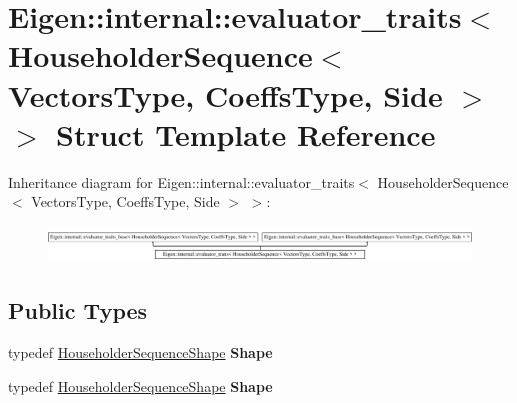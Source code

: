 \hypertarget{struct_eigen_1_1internal_1_1evaluator__traits_3_01_householder_sequence_3_01_vectors_type_00_01_5d5adf52607be62fe2f73ff93bacbb36}{}\section{Eigen\+:\+:internal\+:\+:evaluator\+\_\+traits$<$ Householder\+Sequence$<$ Vectors\+Type, Coeffs\+Type, Side $>$ $>$ Struct Template Reference}
\label{struct_eigen_1_1internal_1_1evaluator__traits_3_01_householder_sequence_3_01_vectors_type_00_01_5d5adf52607be62fe2f73ff93bacbb36}
Inheritance diagram for Eigen\+:\+:internal\+:\+:evaluator\+\_\+traits$<$ Householder\+Sequence$<$ Vectors\+Type, Coeffs\+Type, Side $>$ $>$\+:\begin{figure}[H]
\begin{center}
\leavevmode
\includegraphics[height=0.960549cm]{struct_eigen_1_1internal_1_1evaluator__traits_3_01_householder_sequence_3_01_vectors_type_00_01_5d5adf52607be62fe2f73ff93bacbb36}
\end{center}
\end{figure}
\subsection*{Public Types}
\begin{DoxyCompactItemize}
\item 
\mbox{\label{struct_eigen_1_1internal_1_1evaluator__traits_3_01_householder_sequence_3_01_vectors_type_00_01_5d5adf52607be62fe2f73ff93bacbb36_abbf16f651753ca94ef4b580ed6589381}} 
typedef \hyperlink{struct_eigen_1_1internal_1_1_householder_sequence_shape}{Householder\+Sequence\+Shape} {\bfseries Shape}
\item 
\mbox{\label{struct_eigen_1_1internal_1_1evaluator__traits_3_01_householder_sequence_3_01_vectors_type_00_01_5d5adf52607be62fe2f73ff93bacbb36_abbf16f651753ca94ef4b580ed6589381}} 
typedef \hyperlink{struct_eigen_1_1internal_1_1_householder_sequence_shape}{Householder\+Sequence\+Shape} {\bfseries Shape}
\end{DoxyCompactItemize}



